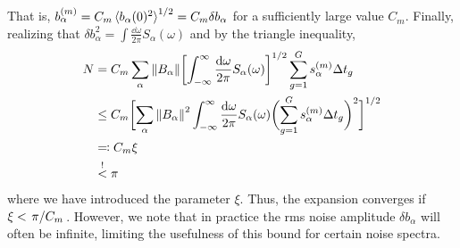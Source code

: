That is, $b_\alpha^{(m)} = C_m \expval*{b_\alpha(0)^2}^{1/2} =  C_m \delta b_\alpha$ for a sufficiently large value $C_m$.
Finally, realizing that $\delta b_\alpha^2 = \int\frac{\dd{\omega}}{2\pi} S_\alpha(\omega)$ and by the triangle inequality,
\begin{equation}
    \begin{split}
        N &= C_m\sum_{\alpha}\norm{B_\alpha}\biggl[\int_{-\infty}^\infty\frac{\mathrm{d}\omega}{2\pi} S_\alpha(\omega)\biggr]^{1/2}
            \sum_{g=1}^{G} s_\alpha^{(m)}\Delta t_g \\
          &\leq C_m\biggl[\sum_{\alpha}\norm{B_\alpha}^2\int_{-\infty}^\infty\frac{\mathrm{d}\omega}{2\pi} S_\alpha(\omega)
            \biggl(\sum_{g=1}^{G} s_\alpha^{(m)}\Delta t_g\biggr)^2\biggr]^{1/2} \\
          &\eqqcolon C_m\xi \\
          &\overset{!}{<} \pi
    \end{split}
\end{equation}
where we have introduced the parameter $\xi$.
Thus, the expansion converges if $\xi < \flatfrac{\pi}{C_m}$.
However, we note that in practice the rms noise amplitude $\delta b_\alpha$ will often be infinite, limiting the usefulness of this bound for certain noise spectra.
